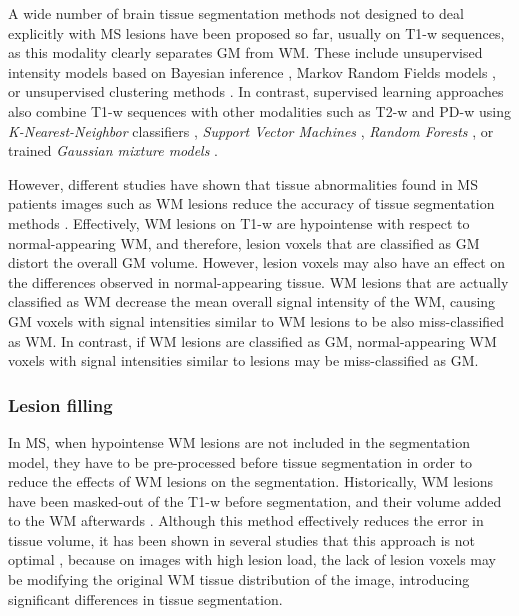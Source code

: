 A wide number of brain tissue segmentation methods not designed to deal explicitly with MS lesions have been proposed so far, usually on T1-w sequences, as this modality clearly separates GM from WM. These include unsupervised intensity models based on Bayesian inference \cite{Ashburner2005,Pohl2006,Roy2012,VanLeemput2003,Wells1996}, Markov Random Fields models \cite{Bricq2008, Tohka2010, Zhang2001}, or unsupervised clustering methods \cite{Caldairou2011, Pham2001}. In contrast, supervised learning approaches also combine T1-w sequences with other modalities such as T2-w and PD-w using \textit{K-Nearest-Neighbor} classifiers \cite{deBoer2009,Vrooman2013}, \textit{Support Vector Machines} \cite{Akselrod2006,Opbroek2013}, \textit{Random Forests} \cite{yi2009,Mahapatra2014}, or trained \textit{Gaussian mixture models} \cite{Rajchl2015}. 

However, different studies have shown that tissue abnormalities found in MS patients images such as WM lesions reduce the accuracy of tissue segmentation methods \cite{Battaglini2012, Chard2010}. Effectively, WM lesions on T1-w are hypointense with respect to normal-appearing WM, and  therefore, lesion voxels that are classified as GM distort the overall GM volume. However, lesion voxels may also have an effect on the differences observed in normal-appearing tissue. WM lesions that are actually classified as WM decrease the mean overall signal intensity of the WM, causing GM voxels with signal intensities similar to WM lesions to be also miss-classified as WM.  In contrast, if WM lesions are classified as GM, normal-appearing WM voxels with signal intensities similar to lesions may be miss-classified as GM. 
 
\subsubsection{Lesion filling}
\label{subsec:lesion_filling}
In MS, when hypointense WM lesions are not included in the segmentation model, they have to be pre-processed before tissue segmentation in order to reduce the effects of WM lesions on the segmentation. Historically, WM lesions have been masked-out of the T1-w before segmentation, and their volume added to the WM afterwards \cite{Chard2002}. Although this method effectively reduces the error in tissue volume, it has been shown in several studies that this approach is not optimal \cite{Battaglini2012, Chard2010}, because on images with high lesion load, the lack of lesion voxels may be modifying the original WM tissue distribution of the image, introducing significant differences in tissue segmentation. 

